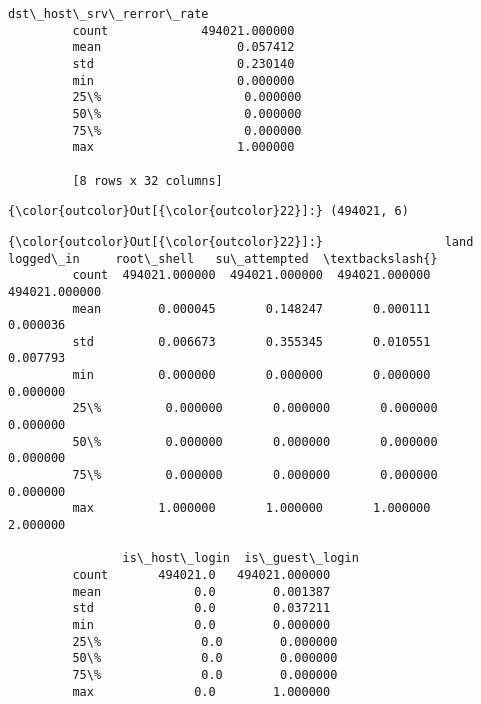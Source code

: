\documentclass[11pt]{article}
\begin{document}
\begin{Verbatim}[commandchars=\\\{\}]
                dst\_host\_srv\_rerror\_rate  
         count             494021.000000  
         mean                   0.057412  
         std                    0.230140  
         min                    0.000000  
         25\%                    0.000000  
         50\%                    0.000000  
         75\%                    0.000000  
         max                    1.000000  
         
         [8 rows x 32 columns]
\end{Verbatim}
            
\begin{Verbatim}[commandchars=\\\{\}]
{\color{outcolor}Out[{\color{outcolor}22}]:} (494021, 6)
\end{Verbatim}
            
\begin{Verbatim}[commandchars=\\\{\}]
{\color{outcolor}Out[{\color{outcolor}22}]:}                 land      logged\_in     root\_shell   su\_attempted  \textbackslash{}
         count  494021.000000  494021.000000  494021.000000  494021.000000   
         mean        0.000045       0.148247       0.000111       0.000036   
         std         0.006673       0.355345       0.010551       0.007793   
         min         0.000000       0.000000       0.000000       0.000000   
         25\%         0.000000       0.000000       0.000000       0.000000   
         50\%         0.000000       0.000000       0.000000       0.000000   
         75\%         0.000000       0.000000       0.000000       0.000000   
         max         1.000000       1.000000       1.000000       2.000000   
         
                is\_host\_login  is\_guest\_login  
         count       494021.0   494021.000000  
         mean             0.0        0.001387  
         std              0.0        0.037211  
         min              0.0        0.000000  
         25\%              0.0        0.000000  
         50\%              0.0        0.000000  
         75\%              0.0        0.000000  
         max              0.0        1.000000  
\end{Verbatim}
            
\end{document}
